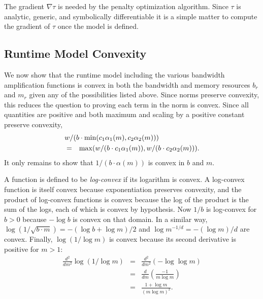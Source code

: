 The gradient $\nabla\tau$ is needed by the penalty optimization algorithm.
Since $\tau$ is analytic, generic, and symbolically differentiable
it is a simple matter to compute the gradient of $\tau$ once the model is defined.

\subsection*{Runtime Model Convexity}

We now show that the runtime model including the various bandwidth amplification functions is convex
in both the bandwidth and memory resources $b_r$ and $m_r$ given any of the possibilities listed above.
Since norms preserve convexity, this reduces the question to proving each term in the norm is convex.
Since all quantities are positive and both maximum and scaling by a positive constant preserve convexity,
\begin{eqnarray*}
\lefteqn{w/(b\cdot\min(c_1\alpha_1(m),c_2\alpha_2(m)))}   \\
&=& \max(w/(b\cdot c_1\alpha_1(m)),w/(b\cdot c_2\alpha_2(m))).
\end{eqnarray*}
It only remains to show that $1/(b\cdot\alpha(m))$ is convex in $b$ and $m$.

A function is defined to be \emph{log-convex} if its logarithm is convex.
A log-convex function is itself convex because exponentiation preserves convexity,
and the product of log-convex functions is convex because the log of the product is the sum of the logs,
each of which is convex by hypothesis.
Now $1/b$ is log-convex for $b > 0$ because $-\log b$ is convex on that domain.
In a similar way, $\log(1/\sqrt{b\cdot m}) = -(\log b + \log m)/2$
and $\log m^{-1/d} = -(\log m)/d$ are convex.
Finally, $\log (1/\log m)$ is convex because its second derivative is positive for $m > 1$:
\begin{eqnarray*}
\frac{d^2}{dm^2}\log (1/\log m) &=& \frac{d^2}{dm^2}(-\log\log m)  \\
                                  &=& \frac{d}{dm}\left(\frac{-1}{m\log m}\right) \\
                                  &=& \frac{1 + \log m}{(m\log m)^2}.
\end{eqnarray*}

